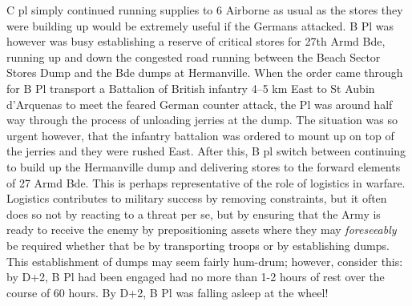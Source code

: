 \documentclass[noraggedright]{turabian-researchpaper}
\begin{document}
C pl simply continued running supplies to 6 Airborne
as usual as the stores they were building up would be extremely useful if
the Germans attacked.   B Pl was however was busy establishing a reserve of 
critical stores for 27th Armd Bde, running up and down the congested road 
running between the Beach Sector Stores Dump and the Bde dumps at Hermanville.
When the order came through for B Pl transport a Battalion of British infantry
4--5 km East to St Aubin d'Arquenas to meet the feared German counter 
attack, the Pl was around half way through the process of unloading jerries 
at the dump.  The situation was so urgent however, that the infantry battalion
was ordered to mount up on top of the jerries and they were rushed East.  After
this, B pl switch between continuing to build up the Hermanville dump and 
delivering stores to the forward elements of 27 Armd Bde.  This is perhaps 
representative of the role of logistics in warfare.  Logistics contributes to
military success by removing constraints, but it often does so not by reacting
to a threat per se, but by ensuring that the Army is ready to receive the 
enemy by prepositioning assets where they may \textit{foreseeably} be 
required whether that be by transporting troops or by establishing dumps.  
This establishment of dumps may seem fairly hum-drum; however, consider this:
by D+2, B Pl had been engaged had no more than 1-2 hours of rest over the 
course of 60 hours.  By D+2, B Pl was falling asleep at the wheel!  
\end{document}
